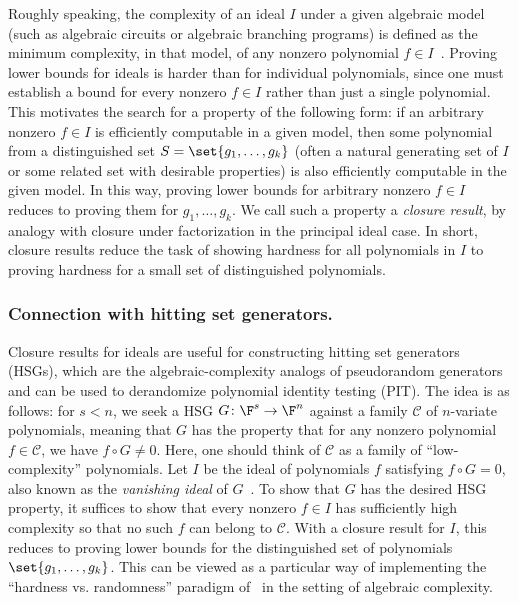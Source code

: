 \documentclass[letterpaper, 11pt]{amsart}
\begin{document}
Roughly speaking, the complexity of an ideal $I$ under a given algebraic model (such as algebraic circuits or algebraic branching programs) is defined as the minimum complexity, in that model, of any nonzero polynomial $f \in I$~\cite{Grochow20}.
Proving lower bounds for ideals is harder than for individual polynomials, since one must establish a bound for every nonzero $f \in I$ rather than just a single polynomial.
This motivates the search for a property of the following form: if an arbitrary nonzero $f \in I$ is efficiently computable in a given model, then some polynomial from a distinguished set $S = \set{g_1, \dots, g_k}$ (often a natural generating set of $I$ or some related set with desirable properties) is also efficiently computable in the given model.
In this way, proving lower bounds for arbitrary nonzero $f \in I$ reduces to proving them for $g_1, \dots, g_k$.
We call such a property a \emph{closure result}, by analogy with closure under factorization in the principal ideal case.
In short, closure results reduce the task of showing hardness for all polynomials in $I$ to proving hardness for a small set of distinguished polynomials.

\subsubsection*{Connection with hitting set generators.} 

Closure results for ideals are useful for constructing hitting set generators (HSGs), which are the algebraic-complexity analogs of pseudorandom generators and can be used to derandomize polynomial identity testing (PIT).
The idea is as follows: for $s < n$, we seek a HSG $G\colon \F^s \to \F^n$ against a family $\mathcal{C}$ of $n$-variate polynomials, meaning that $G$ has the property that for any nonzero polynomial $f \in \mathcal{C}$, we have $f \circ G \neq 0$.
Here, one should think of $\mathcal{C}$ as a family of ``low-complexity'' polynomials.
Let $I$ be the ideal of polynomials $f$ satisfying $f \circ G = 0$, also known as the \emph{vanishing ideal} of $G$~\cite{HvMM24}.
To show that $G$ has the desired HSG property, it suffices to show that every nonzero $f \in I$ has sufficiently high complexity so that no such $f$ can belong to $\mathcal{C}$.
With a closure result for $I$, this reduces to proving lower bounds for the distinguished set of polynomials $\set{g_1, \dots, g_k}$.
This can be viewed as a particular way of implementing the ``hardness vs. randomness'' paradigm of~\cite{NW94} in the setting of algebraic complexity.
\end{document}
